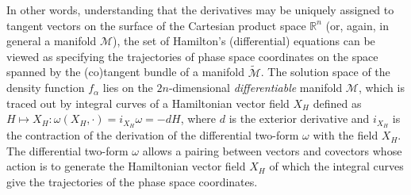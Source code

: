 \documentclass[11pt,titlepage]{report}
\begin{document}
In other words, understanding that the derivatives may be uniquely assigned to tangent vectors on the surface of the Cartesian product space $\mathbb{R}^n$ (or, again, in general a manifold $\mathcal{M}$), the set of Hamilton's (differential) equations can be viewed as specifying the trajectories of phase space coordinates on the space spanned by the (co)tangent bundle of a manifold $\tilde{\mathcal{M}}$. The solution space of the density function $f_{\alpha}$ lies on the $2n$-dimensional \emph{differentiable} manifold $\mathcal{M}$, which is traced out by integral curves of a Hamiltonian vector field $X_H$ defined as $H \mapsto X_H \colon \omega (X_H,\cdot ) = i_{X_H}\omega = -dH$, where $d$ is the exterior derivative and $i_{X_H}$ is the contraction of the derivation of the differential two-form $\omega$ with the field $X_H$. The differential two-form $\omega$ allows a pairing between vectors and covectors whose action is to generate the Hamiltonian vector field $X_H$ of which the integral curves give the trajectories of the phase space coordinates.








\end{document}
